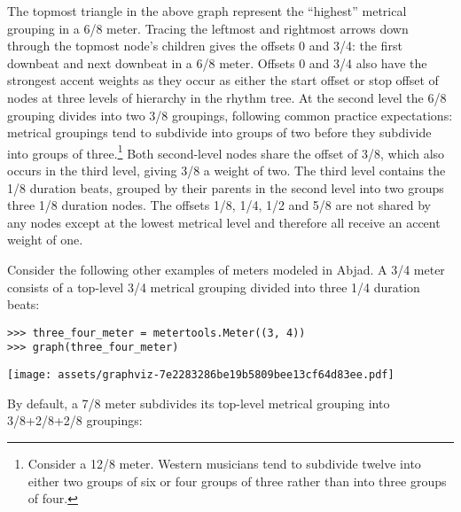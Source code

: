 The topmost triangle in the above graph represent the \enquote{highest}
metrical grouping in a 6/8 meter. Tracing the leftmost and rightmost arrows
down through the topmost node's children gives the offsets 0 and 3/4: the first
downbeat and next downbeat in a 6/8 meter. Offsets 0 and 3/4 also have the
strongest accent weights as they occur as either the start offset or stop
offset of nodes at three levels of hierarchy in the rhythm tree. At the second
level the 6/8 grouping divides into two 3/8 groupings, following common
practice expectations: metrical groupings tend to subdivide into groups of two
before they subdivide into groups of three.\footnote{Consider a 12/8 meter.
Western musicians tend to subdivide twelve into either two groups of six or
four groups of three rather than into three groups of four.} Both second-level
nodes share the offset of 3/8, which also occurs in the third level, giving 3/8
a weight of two. The third level contains the 1/8 duration beats, grouped by
their parents in the second level into two groups three 1/8 duration nodes. The
offsets 1/8, 1/4, 1/2 and 5/8 are not shared by any nodes except at the lowest
metrical level and therefore all receive an accent weight of one.

Consider the following other examples of meters modeled in Abjad. A 3/4 meter
consists of a top-level 3/4 metrical grouping divided into three 1/4 duration
beats:

\begin{comment}
<abjad>
three_four_meter = metertools.Meter((3, 4))
graph(three_four_meter)
</abjad>
\end{comment}

\begin{abjadbookoutput}
\begin{singlespacing}
\vspace{-0.5\baselineskip}
\begin{verbatim}
>>> three_four_meter = metertools.Meter((3, 4))
>>> graph(three_four_meter)
\end{verbatim}
\noindent\texttt{[image: assets/graphviz-7e2283286be19b5809bee13cf64d83ee.pdf]}
\end{singlespacing}
\end{abjadbookoutput}

\noindent By default, a 7/8 meter subdivides its top-level metrical grouping
into 3/8+2/8+2/8 groupings:

\begin{comment}
<abjad>
seven_eight_meter = metertools.Meter((7, 8))
graph(seven_eight_meter)
</abjad>
\end{comment}

